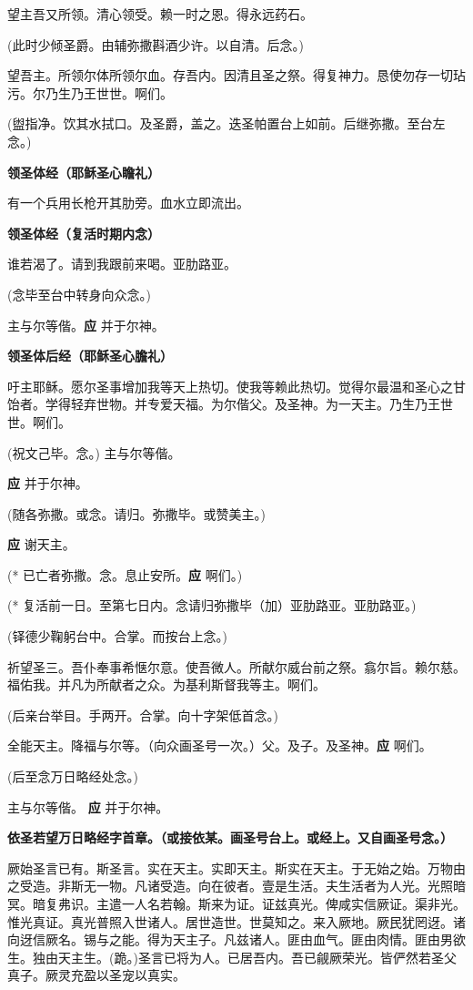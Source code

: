 \documentclass[UTF8,17pt]{ctexart}
\begin{document}
望主吾⼜所领。清⼼领受。赖⼀时之恩。得永远药⽯。

(此时少倾圣爵。由辅弥撒斟酒少许。以⾃清。后念。)

望吾主。所领尔体所领尔⾎。存吾内。因清且圣之祭。得复神⼒。恳使勿存⼀切玷污。尔乃⽣乃王世世。啊们。

(盥指净。饮其⽔拭口。及圣爵，盖之。迭圣帕置台上如前。后继弥撒。⾄台左念。)

\textbf{领圣体经（耶稣圣⼼瞻礼）}

有⼀个兵⽤长枪开其肋旁。⾎⽔⽴即流出。

\textbf{领圣体经（复活时期内念）}

谁若渴了。请到我跟前来喝。亚肋路亚。

(念毕⾄台中转⾝向众念。)

主与尔等偕。\hfill \textbf{应} \quad 并于尔神。

\textbf{领圣体后经（耶稣圣⼼膽礼）}

吁主耶稣。愿尔圣事增加我等天上热切。使我等赖此热切。觉得尔最温和圣⼼之⽢饴者。学得轻弃世物。并专爱天福。为尔偕⽗。及圣神。为⼀天主。乃⽣乃王世世。啊们。

(祝⽂⼰毕。念。) 主与尔等偕。

\textbf{应} \quad 并于尔神。

(随各弥撒。或念。请归。弥撒毕。或赞美主。)

\textbf{应} \quad 谢天主。

(* 已亡者弥撒。念。息⽌安所。\textbf{应} \quad 啊们。)

(* 复活前⼀⽇。⾄第七⽇内。念请归弥撒毕（加）亚肋路亚。亚肋路亚。)

(铎德少鞠躬台中。合掌。⽽按台上念。)

祈望圣三。吾仆奉事希惬尔意。使吾微⼈。所献尔威台前之祭。翕尔旨。赖尔慈。福佑我。并凡为所献者之众。为基利斯督我等主。啊们。

(后亲台举⽬。⼿两开。合掌。向⼗字架低⾸念。)

全能天主。降福与尔等。（向众画圣号⼀次。）⽗。及⼦。及圣神。\textbf{应} \quad 啊们。

(后⾄念万⽇略经处念。)

主与尔等偕。 \hfill \textbf{应} \quad 并于尔神。

\textbf{依圣若望万⽇略经字⾸章。（或接依某。画圣号台上。或经上。又⾃画圣号念。）}

厥始圣⾔已有。斯圣⾔。实在天主。实即天主。斯实在天主。于⽆始之始。万物由之受造。⾮斯⽆⼀物。凡诸受造。向在彼者。壹是⽣活。夫⽣活者为⼈光。光照暗冥。暗复弗识。主遣⼀⼈名若翰。斯来为证。证兹真光。俾咸实信厥证。渠⾮光。惟光真证。真光普照⼊世诸⼈。居世造世。世莫知之。来⼊厥地。厥民犹罔迓。诸向迓信厥名。锡与之能。得为天主⼦。凡兹诸人。匪由⾎⽓。匪由⾁情。匪由男欲生。独由天主生。(跪。)圣言已将为人。已居吾内。吾已觎厥荣光。皆俨然若圣父真子。厥灵充盈以圣宠以真实。
\end{document}
